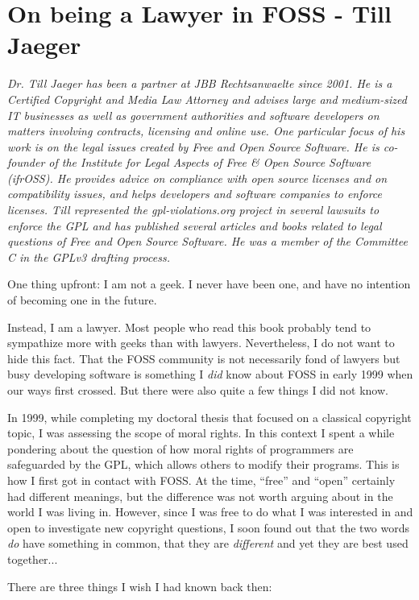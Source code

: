 \chapter{On being a Lawyer in FOSS - Till Jaeger} 

\textit{Dr. Till Jaeger has been a partner at JBB Rechtsanwaelte since 2001. He
is a Certified Copyright and Media Law Attorney and advises large and
medium-sized IT businesses as well as government authorities and software
developers on matters involving contracts, licensing and online use. One
particular focus of his work is on the legal issues created by Free and Open
Source Software. He is co-founder of the Institute for Legal Aspects of Free \&
Open Source Software (ifrOSS). He provides advice on compliance with open source licenses and on
compatibility issues, and helps developers and software companies to enforce
licenses. Till represented the gpl-violations.org project in several lawsuits to enforce
the GPL and has published several articles and books related to legal questions
of Free and Open Source Software. He was a member of the Committee C in the
GPLv3 drafting process.}

One thing upfront: I am not a geek. I never have been one, and have no intention
of becoming one in the future. 

Instead, I am a lawyer. Most people who read this book probably tend to
sympathize more with geeks than with lawyers. Nevertheless, I do not want to
hide this fact. That the FOSS community is not necessarily fond of lawyers but
busy developing software is something I \textit{did} know about FOSS in early
1999 when our ways first crossed. But there were also quite a few things I did
not know.

In 1999, while completing my doctoral thesis that focused on a classical
copyright topic, I was assessing the scope of moral rights. In this context I
spent a while pondering about the question of how moral rights of programmers
are safeguarded by the GPL, which allows others to modify their programs. This
is how I first got in contact with FOSS. At the time, ``free'' and ``open''
certainly had different meanings, but the difference was not worth arguing
about in the world I was living in. However, since I was free to do what I was
interested in and open to investigate new copyright questions, I soon found out
that the two words \textit{do} have something in common, that they are
\textit{different} and yet they are best used together...

There are three things I wish I had known back then:

